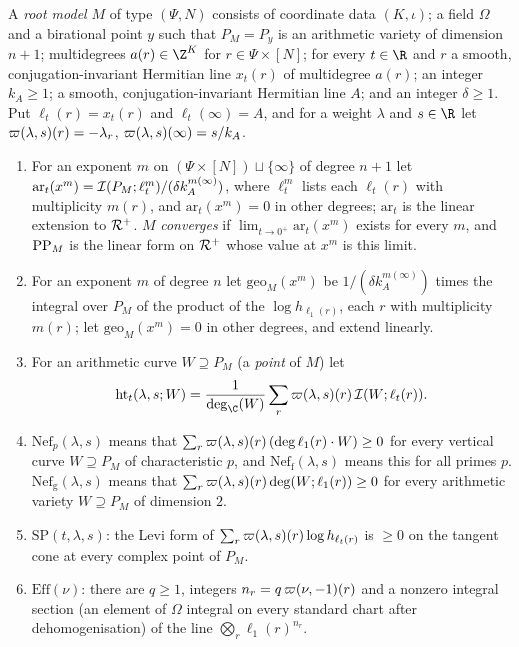 \begin{definition}\label{pf:volthm:def:rootmodel}
A \emph{root model} $M$ of type $(\Psi,N)$ consists of coordinate data $(K,\iota)$; a field $\Omega$ and a
birational point $y$ such that $P_M=P_y$ is an arithmetic variety of dimension $n+1$; multidegrees
$a(r)\in\Z^K$ for $r\in\Psi\times[N]$; for every $t\in\R$ and $r$ a smooth, conjugation-invariant
Hermitian line $x_t(r)$ of multidegree $a(r)$; an integer $k_A\ge1$; a smooth,
conjugation-invariant Hermitian line $A$; and an integer $\delta\ge1$. Put $\ell_t(r)=x_t(r)$ and $\ell_t(\infty)=A$, and for
a weight $\lambda$ and $s\in\R$ let $\varpi(\lambda,s)(r)=-\lambda_r$, $\varpi(\lambda,s)(\infty)=s/k_A$.
\begin{enumerate}[label=(\alph*)]
\item For an exponent $m$ on $(\Psi\times[N])\sqcup\{\infty\}$ of degree $n+1$ let
  $\mathrm{ar}_t(x^m)=\mathcal{I}(P_M;\ell_t^{m})/(\delta k_A^{m(\infty)})$, where $\ell_t^m$ lists each
  $\ell_t(r)$ with multiplicity $m(r)$, and $\mathrm{ar}_t(x^m)=0$ in other degrees; $\mathrm{ar}_t$ is the
  linear extension to $\mathcal{R}^+$. $M$ \emph{converges} if $\lim_{t\to0^+}\mathrm{ar}_t(x^m)$
  exists for every $m$, and $\mathrm{PP}_M$ is the linear form on $\mathcal{R}^+$ whose value at $x^m$ is this limit.
\item For an exponent $m$ of degree $n$ let $\mathrm{geo}_M(x^m)$ be $1/(\delta k_A^{m(\infty)})$ times the integral
  over $P_M$ of the product of the $\log h_{\ell_1(r)}$, each $r$ with multiplicity $m(r)$; let
  $\mathrm{geo}_M(x^m)=0$ in other degrees, and extend linearly.
\item For an arithmetic curve $W\supseteq P_M$ (a \emph{point} of $M$) let
  \[
  \mathrm{ht}_t(\lambda,s;W)=\frac1{\deg_\C(W)}\sum_r\volthmcoef(\lambda,s)(r)\,\volthmII(W;\ell_t(r)).
  \]
\item $\mathrm{Nef}_p(\lambda,s)$ means that $\sum_r\varpi(\lambda,s)(r)\,(\deg\ell_1(r)\cdot W)\ge0$
  for every vertical curve $W\supseteq P_M$ of characteristic $p$, and $\mathrm{Nef}_{\mathrm f}(\lambda,s)$ means
  this for all primes $p$. $\mathrm{Nef}_{\mathrm g}(\lambda,s)$ means that
  $\sum_r\varpi(\lambda,s)(r)\deg(W;\ell_1(r))\ge0$ for every arithmetic variety $W\supseteq P_M$ of
  dimension $2$.
\item $\mathrm{SP}(t,\lambda,s)$: the Levi form of $\sum_r\varpi(\lambda,s)(r)\log h_{\ell_t(r)}$
  is $\ge0$ on the tangent cone at every complex point of $P_M$.
\item $\mathrm{Eff}(\nu)$: there are $q\ge1$, integers $n_r=q\,\varpi(\nu,-1)(r)$ and a nonzero
  integral section (an element of $\Omega$ integral on every standard chart after dehomogenisation)
  of the line $\bigotimes_r\ell_1(r)^{n_r}$.
\end{enumerate}
\end{definition}

